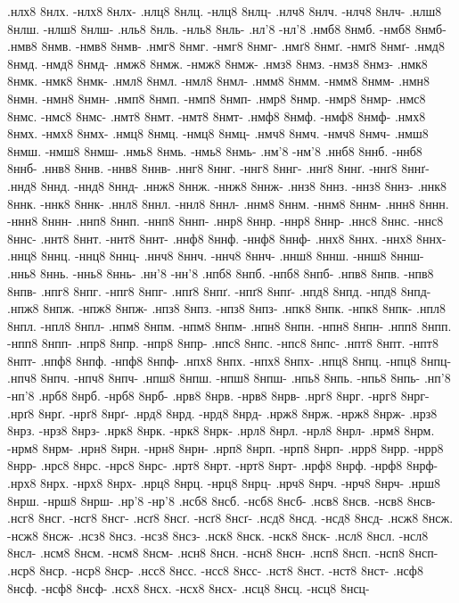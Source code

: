 {.нлх8 8нлх. -нлх8 8нлх-
.нлц8 8нлц. -нлц8 8нлц-
.нлч8 8нлч. -нлч8 8нлч-
.нлш8 8нлш. -нлш8 8нлш-
.нль8 8нль. -нль8 8нль-
.нл'8 -нл'8
.нмб8 8нмб. -нмб8 8нмб-
.нмв8 8нмв. -нмв8 8нмв-
.нмг8 8нмг. -нмг8 8нмг-
.нмґ8 8нмґ. -нмґ8 8нмґ-
.нмд8 8нмд. -нмд8 8нмд-
.нмж8 8нмж. -нмж8 8нмж-
.нмз8 8нмз. -нмз8 8нмз-
.нмк8 8нмк. -нмк8 8нмк-
.нмл8 8нмл. -нмл8 8нмл-
.нмм8 8нмм. -нмм8 8нмм-
.нмн8 8нмн. -нмн8 8нмн-
.нмп8 8нмп. -нмп8 8нмп-
.нмр8 8нмр. -нмр8 8нмр-
.нмс8 8нмс. -нмс8 8нмс-
.нмт8 8нмт. -нмт8 8нмт-
.нмф8 8нмф. -нмф8 8нмф-
.нмх8 8нмх. -нмх8 8нмх-
.нмц8 8нмц. -нмц8 8нмц-
.нмч8 8нмч. -нмч8 8нмч-
.нмш8 8нмш. -нмш8 8нмш-
.нмь8 8нмь. -нмь8 8нмь-
.нм'8 -нм'8
.ннб8 8ннб. -ннб8 8ннб-
.ннв8 8ннв. -ннв8 8ннв-
.ннг8 8ннг. -ннг8 8ннг-
.ннґ8 8ннґ. -ннґ8 8ннґ-
.ннд8 8ннд. -ннд8 8ннд-
.ннж8 8ннж. -ннж8 8ннж-
.ннз8 8ннз. -ннз8 8ннз-
.ннк8 8ннк. -ннк8 8ннк-
.ннл8 8ннл. -ннл8 8ннл-
.ннм8 8ннм. -ннм8 8ннм-
.ннн8 8ннн. -ннн8 8ннн-
.ннп8 8ннп. -ннп8 8ннп-
.ннр8 8ннр. -ннр8 8ннр-
.ннс8 8ннс. -ннс8 8ннс-
.ннт8 8ннт. -ннт8 8ннт-
.ннф8 8ннф. -ннф8 8ннф-
.ннх8 8ннх. -ннх8 8ннх-
.ннц8 8ннц. -ннц8 8ннц-
.ннч8 8ннч. -ннч8 8ннч-
.ннш8 8ннш. -ннш8 8ннш-
.ннь8 8ннь. -ннь8 8ннь-
.нн'8 -нн'8
.нпб8 8нпб. -нпб8 8нпб-
.нпв8 8нпв. -нпв8 8нпв-
.нпг8 8нпг. -нпг8 8нпг-
.нпґ8 8нпґ. -нпґ8 8нпґ-
.нпд8 8нпд. -нпд8 8нпд-
.нпж8 8нпж. -нпж8 8нпж-
.нпз8 8нпз. -нпз8 8нпз-
.нпк8 8нпк. -нпк8 8нпк-
.нпл8 8нпл. -нпл8 8нпл-
.нпм8 8нпм. -нпм8 8нпм-
.нпн8 8нпн. -нпн8 8нпн-
.нпп8 8нпп. -нпп8 8нпп-
.нпр8 8нпр. -нпр8 8нпр-
.нпс8 8нпс. -нпс8 8нпс-
.нпт8 8нпт. -нпт8 8нпт-
.нпф8 8нпф. -нпф8 8нпф-
.нпх8 8нпх. -нпх8 8нпх-
.нпц8 8нпц. -нпц8 8нпц-
.нпч8 8нпч. -нпч8 8нпч-
.нпш8 8нпш. -нпш8 8нпш-
.нпь8 8нпь. -нпь8 8нпь-
.нп'8 -нп'8
.нрб8 8нрб. -нрб8 8нрб-
.нрв8 8нрв. -нрв8 8нрв-
.нрг8 8нрг. -нрг8 8нрг-
.нрґ8 8нрґ. -нрґ8 8нрґ-
.нрд8 8нрд. -нрд8 8нрд-
.нрж8 8нрж. -нрж8 8нрж-
.нрз8 8нрз. -нрз8 8нрз-
.нрк8 8нрк. -нрк8 8нрк-
.нрл8 8нрл. -нрл8 8нрл-
.нрм8 8нрм. -нрм8 8нрм-
.нрн8 8нрн. -нрн8 8нрн-
.нрп8 8нрп. -нрп8 8нрп-
.нрр8 8нрр. -нрр8 8нрр-
.нрс8 8нрс. -нрс8 8нрс-
.нрт8 8нрт. -нрт8 8нрт-
.нрф8 8нрф. -нрф8 8нрф-
.нрх8 8нрх. -нрх8 8нрх-
.нрц8 8нрц. -нрц8 8нрц-
.нрч8 8нрч. -нрч8 8нрч-
.нрш8 8нрш. -нрш8 8нрш-
.нр'8 -нр'8
.нсб8 8нсб. -нсб8 8нсб-
.нсв8 8нсв. -нсв8 8нсв-
.нсг8 8нсг. -нсг8 8нсг-
.нсґ8 8нсґ. -нсґ8 8нсґ-
.нсд8 8нсд. -нсд8 8нсд-
.нсж8 8нсж. -нсж8 8нсж-
.нсз8 8нсз. -нсз8 8нсз-
.нск8 8нск. -нск8 8нск-
.нсл8 8нсл. -нсл8 8нсл-
.нсм8 8нсм. -нсм8 8нсм-
.нсн8 8нсн. -нсн8 8нсн-
.нсп8 8нсп. -нсп8 8нсп-
.нср8 8нср. -нср8 8нср-
.нсс8 8нсс. -нсс8 8нсс-
.нст8 8нст. -нст8 8нст-
.нсф8 8нсф. -нсф8 8нсф-
.нсх8 8нсх. -нсх8 8нсх-
.нсц8 8нсц. -нсц8 8нсц-
}

